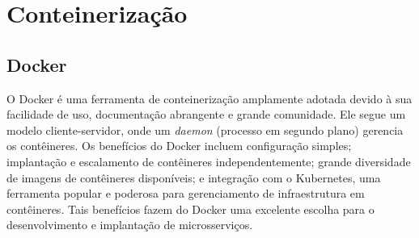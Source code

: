 
\section{Conteinerização}

\subsection*{Docker}
O Docker é uma ferramenta de conteinerização amplamente adotada devido à sua facilidade de uso, documentação abrangente e grande comunidade. Ele segue um modelo cliente-servidor, onde um \emph{daemon} (processo em segundo plano) gerencia os contêineres. Os benefícios do Docker incluem configuração simples; implantação e escalamento de contêineres independentemente; grande diversidade de imagens de contêineres disponíveis; e integração com o Kubernetes, uma ferramenta popular e poderosa para gerenciamento de infraestrutura em contêineres. Tais benefícios fazem do Docker uma excelente escolha para o desenvolvimento e implantação de microsserviços. \cite{lxc-vs-docker,podman-vs-docker}




    
    
